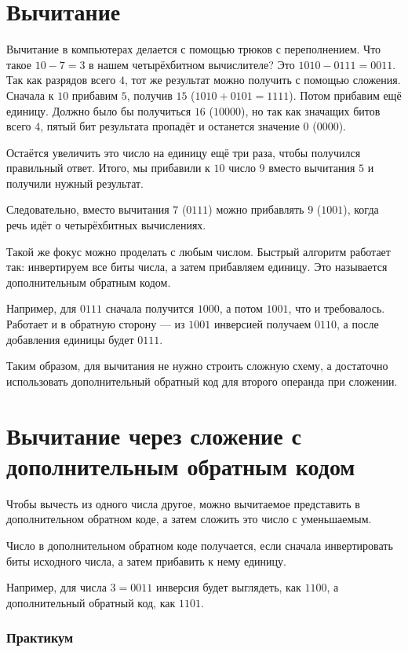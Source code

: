 \section{Вычитание}

Вычитание в компьютерах делается с помощью трюков с переполнением.
Что такое $10-7=3$ в нашем четырёхбитном вычислителе?
Это $1010-0111=0011$. Так как разрядов всего $4$, тот же результат
можно получить с помощью сложения. Сначала к $10$ прибавим $5$, получив $15$
($1010+0101=1111$). Потом прибавим ещё единицу. Должно было бы получиться
$16$ ($10000$), но так как значащих битов всего $4$, пятый бит результата
пропадёт и останется значение $0$ ($0000$).

Остаётся увеличить это число на единицу ещё три раза, чтобы получился
правильный ответ. Итого, мы прибавили к $10$ число $9$ вместо вычитания $5$
и получили нужный результат.

Следовательно, вместо вычитания $7$ ($0111$) можно прибавлять $9$ ($1001$),
когда речь идёт о четырёхбитных вычислениях.

Такой же фокус можно проделать с любым числом. Быстрый алгоритм работает так:
инвертируем все биты числа, а затем прибавляем единицу. Это называется
дополнительным обратным кодом.

Например, для $0111$ сначала получится $1000$, а потом $1001$, что и требовалось.
Работает и в обратную сторону --- из $1001$ инверсией получаем $0110$,
а после добавления единицы будет $0111$.

Таким образом, для вычитания не нужно строить сложную схему, а достаточно
использовать дополнительный обратный код для второго операнда при сложении.

\section{Вычитание через сложение с дополнительным обратным кодом}

Чтобы вычесть из одного числа другое, можно вычитаемое представить в дополнительном обратном
коде, а затем сложить это число с уменьшаемым.

Число в дополнительном обратном коде получается, если сначала инвертировать биты исходного
числа, а затем прибавить к нему единицу.

Например, для числа $3=0011$ инверсия будет выглядеть, как $1100$, а дополнительный обратный код, как $1101$.

\subsubsection{Практикум}


